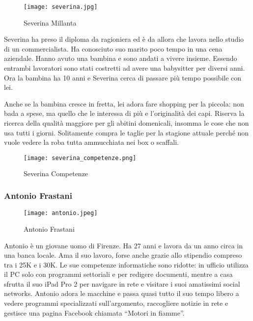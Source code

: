 \documentclass[12pt,italian,]{report}
\begin{document}
\begin{figure}
\centering
\texttt{[image: severina.jpg]}
\caption{Severina Millanta}
\end{figure}

Severina ha preso il diploma da ragioniera ed è da allora che lavora
nello studio di un commercialista. Ha conosciuto suo marito poco tempo
in una cena aziendale. Hanno avuto una bambina e sono andati a vivere
insieme. Essendo entrambi lavoratori sono stati costretti ad avere una
babysitter per diversi anni. Ora la bambina ha 10 anni e Severina cerca
di passare più tempo possibile con lei.

Anche se la bambina cresce in fretta, lei adora fare shopping per la
piccola: non bada a spese, ma quello che le interessa di più e
l'originalità dei capi. Riserva la ricerca della qualità maggiore per
gli abitini domenicali, insomma le cose che non usa tutti i giorni.
Solitamente compra le taglie per la stagione attuale perché non vuole
vedere la roba tutta ammucchiata nei box o scaffali.

\begin{figure}
\centering
\texttt{[image: severina\_competenze.png]}
\caption{Severina Competenze}
\end{figure}

\hypertarget{antonio-frastani-1}{%
\subsubsection{Antonio Frastani}\label{antonio-frastani-1}}

\begin{figure}
\centering
\texttt{[image: antonio.jpeg]}
\caption{Antonio Frastani}
\end{figure}

Antonio è un giovane uomo di Firenze. Ha 27 anni e lavora da un anno
circa in una banca locale. Ama il suo lavoro, forse anche grazie allo
stipendio compreso tra i 25K e i 30K. Le sue competenze informatiche
sono ridotte: in ufficio utilizza il PC solo con programmi settoriali e
per redigere documenti, mentre a casa sfrutta il suo iPad Pro 2 per
navigare in rete e visitare i suoi amatissimi social networks. Antonio
adora le macchine e passa quasi tutto il suo tempo libero a vedere
programmi specializzati sull'argomento, raccogliere notizie in rete e
gestisce una pagina Facebook chiamata ``Motori in fiamme''.
\end{document}

